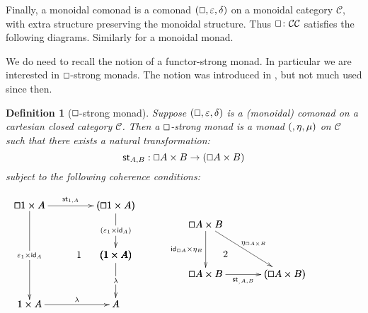 \documentclass{article}
\let\Diamond\relax
\let\mto\to
\let\to\relax
\newcommand{\to}{\rightarrow}
\renewcommand{\Box}{\oblong}
\newcommand{\cat}[1]{\mathcal{#1}}
\newcommand{\pd}[0]{\times}
\newcommand{\st}[2]{\mathsf{st}_{#1,#2}}
\newcommand{\id}[0]{\mathsf{id}}
\newtheorem{definition}[theorem]{Definition}
\begin{document}
Finally,
a monoidal comonad is a comonad $(\Box,\varepsilon, \delta)$ on a monoidal category $\cat{C}$, with extra structure preserving the monoidal structure. Thus $\Box\colon \cat{C}\to \cat{C}$ satisfies the following diagrams.{}
Similarly for a monoidal monad.

We do need to recall the notion of a functor-strong monad. In particular we are interested in $\Box$-strong monads. The notion was introduced in \cite{CS4}, but not much used since then.

\begin{definition}[$\Box$-strong monad]
  \label{def:comonad-strong-monad}
  Suppose $(\Box, \varepsilon, \delta)$ is a (monoidal) comonad on a
  cartesian closed category $\cat{C}$.  Then a \emph{$\Box$-strong
    monad} is a monad $(\Diamond,\eta,\mu)$ on $\cat{C}$ such that
  there exists a natural transformation:
  \[
  \st{A}{B} : \Box A \pd \Diamond B \mto \Diamond(\Box A \pd B)
  \]
  subject to the following coherence conditions:
  \begin{center}
    \begin{math}      
      \begin{array}{lllll}
        \bfig
      \vSquares|ammmmma|/>``>```>`>/[\Box 1 \times \Diamond A`\Diamond (\Box 1 \times A)``\Diamond(1 \times A)`1 \times \Diamond A`\Diamond A;\st{1}{A}``\Diamond(\varepsilon_1 \times \id_A)```\Diamond\lambda`\lambda]
      \morphism(0,1000)|m|/->/<0,-950>[`;\varepsilon_1 \times \id_{\Diamond A}]
      \place(500,500)[1]
      \efig
      & \quad & 
      \bfig
      \btriangle<800,500>[\Box A \pd B`\Box A \pd \Diamond B`\Diamond(\Box A \pd B);\id_{\Box A} \pd \eta_{B}`\eta_{\Box A \times B}`\st_{A,B}]
      \place(200,200)[2]
      \efig
      \end{array}      
    \end{math}
    \\
    \vspace{30px}

\end{center}
\end{definition}
\end{document}
